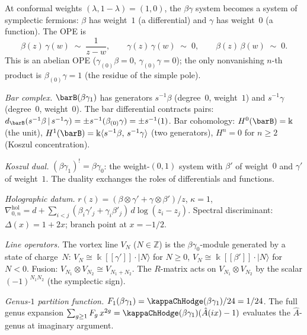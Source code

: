 \begin{computation}[$\beta\gamma$ at $\lambda=1$: symplectic
fermions as a holographic system; \ClaimStatusProvedHere]
At conformal weights $(\lambda,1{-}\lambda)=(1,0)$, the
$\beta\gamma$ system becomes a system of symplectic fermions:
$\beta$ has weight~$1$ (a differential) and $\gamma$ has
weight~$0$ (a function). The OPE is
\[
\beta(z)\,\gamma(w)\;\sim\;\frac{1}{z-w},
\qquad
\gamma(z)\,\gamma(w)\;\sim\;0,
\qquad
\beta(z)\,\beta(w)\;\sim\;0.
\]
This is an abelian OPE ($\gamma_{(0)}\beta=0$,
$\gamma_{(0)}\gamma=0$); the only nonvanishing $n$-th product
is $\beta_{(0)}\gamma=1$ (the residue of the simple pole).

\emph{Bar complex.}
$\barB(\beta\gamma_1)$ has generators $s^{-1}\beta$ (degree~$0$,
weight~$1$) and $s^{-1}\gamma$ (degree~$0$, weight~$0$).
The bar differential contracts pairs:
$d_{\barB}(s^{-1}\beta\,|\,s^{-1}\gamma)
=\pm s^{-1}(\beta_{(0)}\gamma)=\pm s^{-1}(1)$.
Bar cohomology: $H^0(\barB)=\Bbbk$ (the unit),
$H^1(\barB)=\Bbbk\langle s^{-1}\beta,\,s^{-1}\gamma\rangle$
(two generators), $H^n=0$ for $n\ge 2$ (Koszul concentration).

\emph{Koszul dual.}
$(\beta\gamma_1)^!=\beta\gamma_0$: the weight-$(0,1)$ system
with $\beta'$ of weight~$0$ and $\gamma'$ of weight~$1$.
The duality exchanges the roles of differentials and functions.

\emph{Holographic datum.}
$r(z)=(\beta\otimes\gamma'+\gamma\otimes\beta')/z$,
$\kappa=1$,
$\nabla^{\mathrm{hol}}_{0,n}
=d+\sum_{i<j}
(\beta_i\gamma'_j+\gamma_i\beta'_j)\,d\log(z_i-z_j)$.
Spectral discriminant: $\Delta(x)=1+2x$; branch point at
$x=-1/2$.

\emph{Line operators.}
The vortex line $V_N$ ($N\in\mathbb Z$) is the
$\beta\gamma_0$-module generated by a state of charge~$N$:
$V_N\cong\Bbbk[[\gamma']]\cdot|N\rangle$ for $N\ge 0$,
$V_N\cong\Bbbk[[\beta']]\cdot|N\rangle$ for $N<0$.
Fusion: $V_{N_1}\otimes V_{N_2}\cong V_{N_1+N_2}$.
The $R$-matrix acts on $V_{N_1}\otimes V_{N_2}$ by the scalar
$(-1)^{N_1 N_2}$ (the symplectic sign).

\emph{Genus-$1$ partition function.}
$F_1(\beta\gamma_1)=\kappaChHodge(\beta\gamma_1)/24 = 1/24$.
The full genus expansion
$\sum_{g\ge 1}F_g\,x^{2g}=\kappaChHodge(\beta\gamma_1)(\hat A(ix)-1)$
evaluates the $\hat A$-genus at imaginary argument.
\end{computation}

